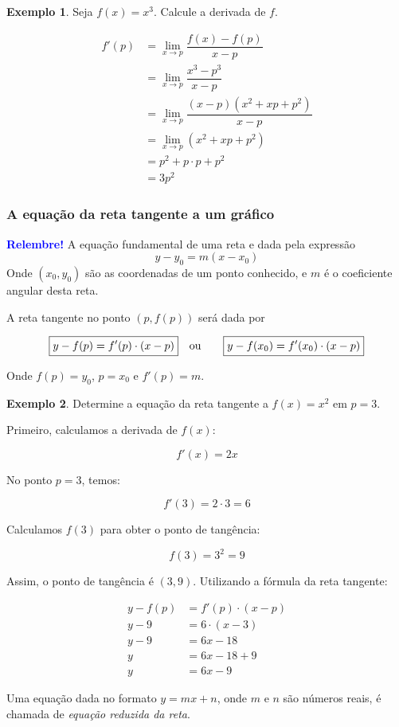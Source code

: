 \documentclass[12pt,openright,twoside,a4paper]{article}
\theoremstyle{definition}
\newtheorem{example}{Exemplo}[section]
\begin{document}
	\begin{example}
		Seja $f(x) = x^3$. Calcule a derivada de $f$.
		
		\begin{align*}
			f'(p) &= \lim_{x \to p} \dfrac{f(x) - f(p)}{x-p} \\
			&= \lim_{x \to p} \dfrac{x^3 - p^3}{x-p} \\
			&= \lim_{x \to p} \dfrac{(x - p)(x^2 + xp + p^2)}{x-p} \\
			&= \lim_{x \to p} (x^2 + xp + p^2) \\
			&= p^2 + p \cdot p + p^2 \\
			&= 3p^2
		\end{align*}
	\end{example}
	
	\subsubsection{A equação da reta tangente a um gráfico}
	\begin{snugshade}
		\textbf{\textcolor{blue}{Relembre!}}
		A equação fundamental de uma reta e dada pela expressão
		\begin{equation*}
			y - y_0 = m(x - x_0)
		\end{equation*}
		Onde $(x_0, y_0)$ são as coordenadas de um ponto conhecido, e $m$ é o coeficiente angular desta reta.
	\end{snugshade}
	
	A reta tangente no ponto $(p, f(p))$ será dada por
	
	\begin{align*}
		\Aboxed{y - f(p) &= f'(p) \cdot (x - p)} \quad \text{ou} \quad \Aboxed{y - f(x_0) &= f'(x_0) \cdot (x - p)}
	\end{align*}
	
	Onde $f(p) = y_0$, $p=x_0$ e $f'(p) = m$.
	
	\begin{example}
		Determine a equação da reta tangente a $f(x) = x^2$ em $p=3$.
		
		Primeiro, calculamos a derivada de $f(x)$:
		
		$$
		f'(x) = 2x
		$$
		
		No ponto $p = 3$, temos:
		
		$$
		f'(3) = 2 \cdot 3 = 6
		$$
		
		Calculamos $f(3)$ para obter o ponto de tangência:
		
		$$
		f(3) = 3^2 = 9
		$$
		
		Assim, o ponto de tangência é $(3, 9)$. Utilizando a fórmula da reta tangente:
		
		\begin{align*}
			y - f(p) &= f'(p) \cdot (x - p) \\
			y - 9 &= 6 \cdot (x - 3) \\
			y - 9 &= 6x - 18 \\
			y &= 6x - 18 + 9 \\
			y &= 6x - 9
		\end{align*}
		
		Uma equação dada no formato $y=mx + n$, onde $m$ e $n$ são números reais, é chamada de \textit{equação reduzida da reta}.
	\end{example} 
	
\end{document}

